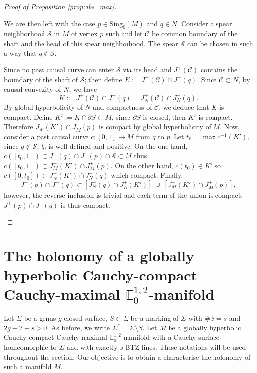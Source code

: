 \documentclass[a4paper,12pt]{article}
\def\C{\mathcal C}
\def\S{\mathcal S}
\def\S{\mathcal{S}}
\def\sing{\mathrm{Sing}}
\newcommand{\mass}[1]{{\mathbb E}^{1,2}_{#1}}
\begin{document}
\begin{proof}[Proof of Proposition \ref{prop:abs_max}]
\begin{itemize}
 We are then left with the case $p\in \sing_0(M)$ and $q\in N$. 
Consider a spear neighborhood $\mathcal S$ in $M$ of vertex $p$ such and let $\mathcal C$ be common boundary of the shaft and the head of this spear neighborhood. The spear $\S$ can be chosen in such a way that $q\notin \S$.

Since no past causal curve can enter $\S$ via its head and $J^+(\C)$ contains the boundary of the shaft of $\S$; then define $K := J^+(\mathcal C)\cap J^-(q)$. Since $\C\subset N$, by causal convexity of $N$, we have
 $$K := J^+(\mathcal C)\cap J^-(q)=J^+_{N}(\mathcal C)\cap J^-_{N}(q).$$ By global hyperbolicity of $N$ and compactness of $\C$, we deduce that $K$ is compact. Define $K':=K\cap \partial S\subset M$, since $\partial S$ is closed, then $K'$ is compact.   Therefore  $J^-_M(K')\cap J^+_M(p)$ is compact by global hyperbolicity of $M$. 
Now, consider a past causal curve $c:[0,1]\rightarrow \overline M$ from $q$ to $p$. Let $t_0 = \max c^{-1}(K')$, since $q\notin \S$, $t_0$ is well defined and positive.
On the one hand, $c([t_0,1])\subset J^-(q)\cap J^+(p)\cap \S\subset M$ thus 
$c([t_0,1]) \subset J^-_M(K')\cap J^+_M(p)$. On the other hand, $c(t_0)\in K'$ so $c([0,t_0])\subset J^+_N(K')\cap J^-_N(q)$ which compact.
Finally,
$$ J^+(p)\cap J^-(q) \subset \left[J^-_N(q)\cap J^+_N(K')\right] ~\cup~  \left[J^-_M( K' )\cap J^+_M(p)\right],$$
however, the reverse inclusion is trivial and
each term of the union is compact; $ J^+(p)\cap J^-(q) $ is thus compact. 
 \end{itemize}


\end{proof}


\section{The holonomy of a globally hyperbolic Cau\-chy-compact Cauchy-maximal $\mass{0}$-manifold}
\label{sec:holonomy}
Let $\Sigma$ be a genus $g$ closed surface, $S\subset \Sigma$ be a marking of $\Sigma$ with $\#S=s$ and $2g-2+s>0$. As before, we write $\Sigma^* = \Sigma \setminus S$. Let $M$ be a globally hyperbolic Cauchy-compact Cauchy-maximal $\mass{0}$-manifold with a Cauchy-surface homeomorphic to $\Sigma$ and with exactly $s$ BTZ lines. These notations will be used throughout the section. Our objective is to obtain a characterise the holonomy of such a manifold $M$.

\end{document}
